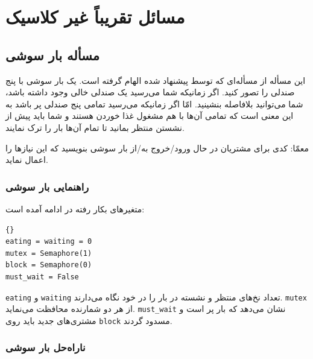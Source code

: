 \documentclass{book}
\newcommand{\clearemptydoublepage}{\newpage\cleardoublepage}
\begin{document}
\chapter{مسائل تقریباً غیر کلاسیک}

\section{مسأله بار سوشی}

    این مسأله از مسأله‌ای که توسط  پیشنهاد شده الهام گرفته است\cite{reek}. یک بار سوشی با پنج صندلی را  تصور کنید.
    اگر زمانیکه شما می‌رسید یک صندلی خالی وجود داشته باشد، شما می‌توانید بلافاصله بنشینید. امّا اگر زمانیکه می‌رسید تمامی پنج صندلی پر باشد 
    به این معنی است که تمامی آن‌ها با هم مشغول غذا خوردن هستند و شما باید پیش از نشستن منتظر بمانید تا تمام آن‌ها بار را ترک نمایند. 
    
    معمّا: کدی برای مشتریان در حال ورود/خروج  به/از بار سوشی بنویسید که این نیازها را اعمال نماید. 

\clearemptydoublepage
\subsection{راهنمایی بار سوشی}

    متغیرهای بکار رفته در ادامه آمده است:

\begin{latin}
\begin{lstlisting}[title=\rl{راهنمایی بار سوشی}]{}
eating = waiting = 0
mutex = Semaphore(1)
block = Semaphore(0)
must_wait = False
\end{lstlisting}
\end{latin}



    {\tt eating} و {\tt waiting}
    تعداد نخ‌های منتظر و نشسته در بار را در خود نگاه می‌دارند. {\tt mutex}  از هر دو شمارنده محافظت می‌نماید.  {\tt must\_wait}
    نشان می‌دهد که بار پر است و مشتری‌های جدید باید روی  {\tt block} مسدود گردند. 
    

\clearemptydoublepage
\subsection{ناراه‌حل بار سوشی}
\end{document}
